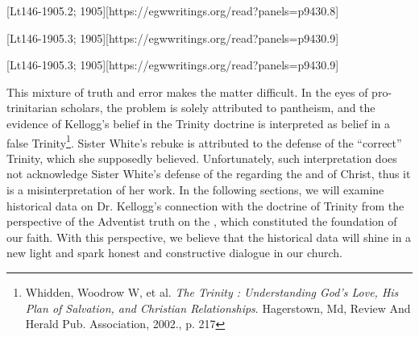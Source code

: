 [Lt146-1905.2; 1905][https://egwwritings.org/read?panels=p9430.8]


[Lt146-1905.3; 1905][https://egwwritings.org/read?panels=p9430.9]


[Lt146-1905.3; 1905][https://egwwritings.org/read?panels=p9430.9]


This mixture of truth and error makes the matter difficult. In the eyes of pro-trinitarian scholars, the problem is solely attributed to pantheism, and the evidence of Kellogg's belief in the Trinity doctrine is interpreted as belief in a false Trinity\footnote{Whidden, Woodrow W, et al. \textit{The Trinity : Understanding God's Love, His Plan of Salvation, and Christian Relationships}. Hagerstown, Md, Review And Herald Pub. Association, 2002., p. 217}. Sister White's rebuke is attributed to the defense of the “correct” Trinity, which she supposedly believed. Unfortunately, such interpretation does not acknowledge Sister White's defense of the  regarding the  and of Christ, thus it is a misinterpretation of her work. In the following sections, we will examine historical data on Dr. Kellogg's connection with the doctrine of Trinity from the perspective of the Adventist truth on the , which constituted the foundation of our faith. With this perspective, we believe that the historical data will shine in a new light and spark honest and constructive dialogue in our church.


